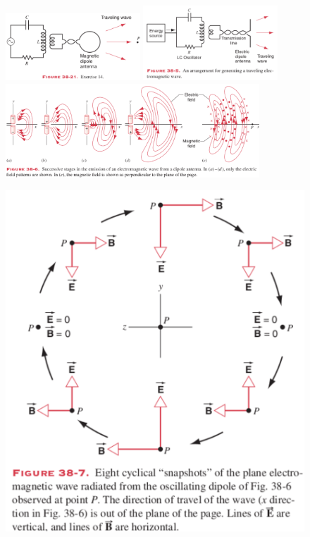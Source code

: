 \documentclass[11pt,letterpaper,boxed]{pset}
\begin{document}
    \begin{figure} [ht]
        \centering
        \begin{minipage}{0.7\textwidth}
            \centering
            \includegraphics[width=0.45\textwidth]{HW11Images/E38-14.png}
            \includegraphics[width=0.45\textwidth]{HW11Images/Fig38-5.png}
            \includegraphics[width=0.85\textwidth]{HW11Images/Fig38-6.png}
        \end{minipage}
        \begin{minipage}{0.25\textwidth}
        \includegraphics[width=\textwidth]{HW11Images/Fig38-7.png}
        \end{minipage}
    \end{figure}
    \newpage
    
\end{document}
